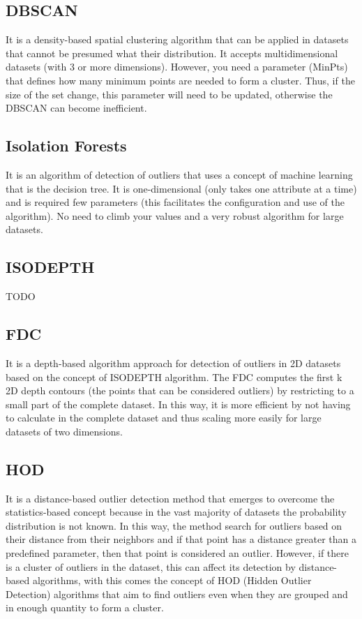 \subsection{DBSCAN}

It is a density-based spatial clustering algorithm that can be applied in datasets that
cannot be presumed what their distribution. It accepts multidimensional datasets (with
3 or more dimensions). However, you need a parameter (MinPts) that defines how many
minimum points are needed to form a cluster. Thus, if the size of the set change, this
parameter will need to be updated, otherwise the DBSCAN can become inefficient.

\subsection{Isolation Forests}

It is an algorithm of detection of outliers that uses a concept of machine learning that
is the decision tree. It is one-dimensional (only takes one attribute at a time) and is
required few parameters (this facilitates the configuration and use of the algorithm).
No need to climb your values and a very robust algorithm for large datasets.

\subsection{ISODEPTH}

TODO

\subsection{FDC}

It is a depth-based algorithm approach for detection of outliers in 2D datasets based on
the concept of ISODEPTH algorithm. The FDC computes the first k 2D depth contours (the
points that can be considered outliers) by restricting to a small part of the complete
dataset. In this way, it is more efficient by not having to calculate in the complete
dataset and thus scaling more easily for large datasets of two dimensions.

\subsection{HOD}

It is a distance-based outlier detection method that emerges to overcome the statistics-based
concept because in the vast majority of datasets the probability distribution is not known.
In this way, the method search for outliers based on their distance from their neighbors
and if that point has a distance greater than a predefined parameter, then that point is
considered an outlier. However, if there is a cluster of outliers in the dataset, this
can affect its detection by distance-based algorithms, with this comes the concept of HOD
(Hidden Outlier Detection) algorithms that aim to find outliers even when they are grouped
and in enough quantity to form a cluster.

